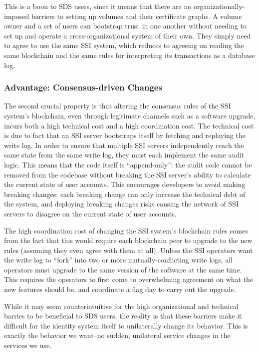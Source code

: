 This is a boon to SDS users, since it means
that there are no organizationally-imposed barriers to setting up volumes and
their certificate graphs.  A volume owner and a set of users can bootstrap trust
in one another without needing to set up and operate a cross-organizational
system of their own.  They simply need to agree to use the same SSI system,
which reduces to agreeing on reading the same blockchain and the same rules for
interpreting its transactions as a database log.

\subsubsection{Advantage: Consensus-driven Changes}

The second crucial property is that altering the consensus rules of the SSI system's
blockchain, even through legitimate channels such as a 
software upgrade, incurs both a high technical cost and a high coordination cost.
The technical cost is due to fact that an SSI server
bootstraps itself by fetching and replaying the write log.  In order to
ensure that multiple SSI servers independently reach the same state from the
same write log, they must each implement the same audit logic.  This means that
the code itself is ``append-only'':  the audit code cannot be removed from
the codebase without breaking the SSI server's ability to calculate the current
state of user accounts.  This encourages developers to avoid making breaking
changes: each breaking change can only increase the technical debt of the
system, and deploying breaking changes risks causing the network of SSI servers
to disagree on the current state of user accounts.

The high coordination cost of changing the SSI system's blockchain rules
comes from the fact that this would require each blockchain peer to upgrade
to the new rules (assuming they even agree with them at all).  Unless the SSI
operators want the write log to ``fork'' into two or more mutually-conflicting
write logs, all operators must upgrade to the same version of the software
at the same time.  This requires the operators to first come to overwhelming
agreement on what the new features should be, and coordinate a flag day
to carry out the upgrade.

While it may seem counterintuitive for the high organizational and technical
barries to be beneficial to SDS users, the reality is that these barriers
make it difficult for the identity system itself to unilaterally change its
behavior.  This is exactly the behavior we want--no sudden,
unilateral service changes in the services we use.

